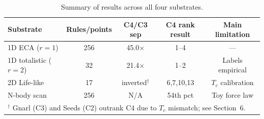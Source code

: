 \documentclass[12pt,a4paper]{article}
\begin{document}
\begin{table}[h]
\centering
\caption{Summary of results across all four substrates.}
\begin{tabular}{lcccc}
\toprule
Substrate & Rules/points & C4/C3 sep & C4 rank result & Main limitation \\
\midrule
1D ECA ($r{=}1$)       & 256 & 45.0$\times$ & 1--4         & --- \\
1D totalistic ($r{=}2$) & 32  & 21.4$\times$ & 1--2         & Labels empirical \\
2D Life-like            & 17  & inverted$^\dagger$ & 6,7,10,13  & $T_c$ calibration \\
N-body scan             & 256 & N/A          & 54th pct     & Toy force law \\
\bottomrule
\multicolumn{5}{l}{%
  $^\dagger$ Gnarl (C3) and Seeds (C2) outrank C4 due to $T_c$ mismatch; see Section~6.}
\end{tabular}
\end{table}
\end{document}
